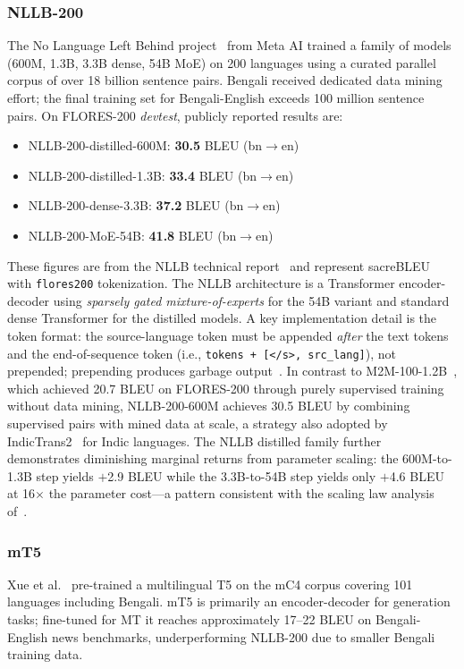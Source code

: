 \documentclass[conference]{IEEEtran}
\begin{document}
\subsubsection{NLLB-200}
The No Language Left Behind project~\cite{nllb2022} from Meta AI trained
a family of models (600M, 1.3B, 3.3B dense, 54B MoE) on 200 languages
using a curated parallel corpus of over 18 billion sentence pairs.
Bengali received dedicated data mining effort; the final training
set for Bengali-English exceeds 100 million sentence pairs.
On FLORES-200 \textit{devtest}, publicly reported results are:
\begin{itemize}
  \item NLLB-200-distilled-600M: \textbf{30.5} BLEU (bn$\to$en)
  \item NLLB-200-distilled-1.3B: \textbf{33.4} BLEU (bn$\to$en)
  \item NLLB-200-dense-3.3B: \textbf{37.2} BLEU (bn$\to$en)
  \item NLLB-200-MoE-54B: \textbf{41.8} BLEU (bn$\to$en)
\end{itemize}
These figures are from the NLLB technical report~\cite{nllb2022} and
represent sacreBLEU with \texttt{flores200} tokenization.
The NLLB architecture is a Transformer encoder-decoder using
\textit{sparsely gated mixture-of-experts} for the 54B variant and
standard dense Transformer for the distilled models.
A key implementation detail is the token format: the source-language
token must be appended \textit{after} the text tokens and the
end-of-sequence token (i.e., \texttt{tokens + [</s>, src\_lang]}),
not prepended; prepending produces garbage output~\cite{biswas2025bnentr}.
In contrast to M2M-100-1.2B~\cite{fan2021m2m100}, which achieved 20.7 BLEU
on FLORES-200 through purely supervised training without data mining,
NLLB-200-600M achieves 30.5 BLEU by combining supervised pairs with mined
data at scale, a strategy also adopted by IndicTrans2~\cite{gala2023indictrans2}
for Indic languages.
The NLLB distilled family further demonstrates diminishing marginal returns
from parameter scaling: the 600M-to-1.3B step yields $+$2.9 BLEU while the
3.3B-to-54B step yields only $+$4.6 BLEU at 16$\times$ the parameter
cost---a pattern consistent with the scaling law analysis of~\cite{nllb2022}.

\subsubsection{mT5}
Xue et al.~\cite{xue2021mt5} pre-trained a multilingual T5 on the
mC4 corpus covering 101 languages including Bengali.
mT5 is primarily an encoder-decoder for generation tasks; fine-tuned
for MT it reaches approximately 17--22 BLEU on Bengali-English news
benchmarks, underperforming NLLB-200 due to smaller Bengali training
data.
\end{document}
